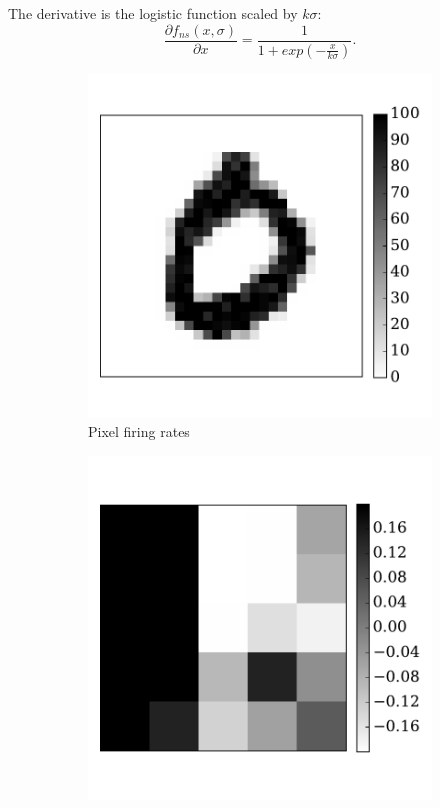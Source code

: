 	The derivative is the logistic function scaled by $k\sigma$:
	\begin{equation}
	\frac{\partial f_{ns}(x,\sigma)}{\partial x} = \frac{1}{1+exp(-\frac{x}{k\sigma})}.
	\label{equ:logist}
	\end{equation}	
	
	\begin{figure}[bt!]
		\centering
		\begin{subfigure}[t]{0.3\textwidth}
			\includegraphics[width=\textwidth]{pics_iconip/6-2.pdf}
		    \caption{Pixel firing rates}
		    \label{Fig:62}
		\end{subfigure}
		\begin{subfigure}[t]{0.3\textwidth}
			\includegraphics[width=\textwidth]{pics_iconip/6-3.pdf}

\end{subfigure}
\end{figure}
